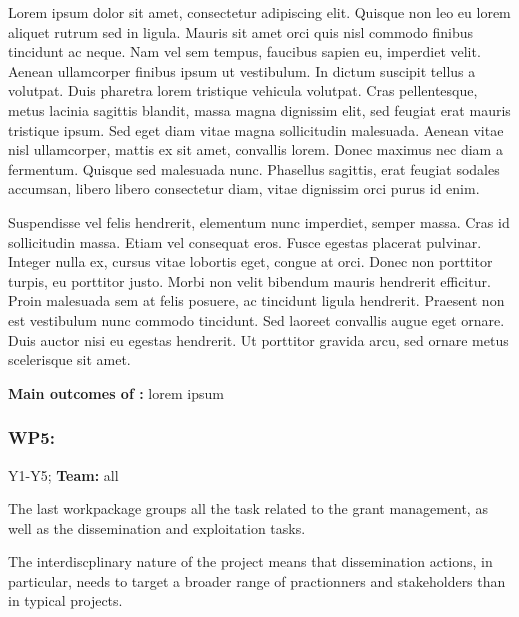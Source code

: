 \begin{rewrite}
Lorem ipsum dolor sit amet, consectetur adipiscing elit. Quisque non leo eu
lorem aliquet rutrum sed in ligula. Mauris sit amet orci quis nisl commodo
finibus tincidunt ac neque. Nam vel sem tempus, faucibus sapien eu,
imperdiet velit. Aenean ullamcorper finibus ipsum ut vestibulum. In dictum
suscipit tellus a volutpat. Duis pharetra lorem tristique vehicula volutpat.
Cras pellentesque, metus lacinia sagittis blandit, massa magna dignissim
elit, sed feugiat erat mauris tristique ipsum. Sed eget diam vitae magna
sollicitudin malesuada. Aenean vitae nisl ullamcorper, mattis ex sit amet,
convallis lorem. Donec maximus nec diam a fermentum. Quisque sed malesuada
nunc. Phasellus sagittis, erat feugiat sodales accumsan, libero libero
consectetur diam, vitae dignissim orci purus id enim.

Suspendisse vel felis hendrerit, elementum nunc imperdiet, semper massa. Cras id
sollicitudin massa. Etiam vel consequat eros. Fusce egestas placerat
pulvinar. Integer nulla ex, cursus vitae lobortis eget, congue at orci.
Donec non porttitor turpis, eu porttitor justo. Morbi non velit bibendum
mauris hendrerit efficitur. Proin malesuada sem at felis posuere, ac
tincidunt ligula hendrerit. Praesent non est vestibulum nunc commodo
tincidunt. Sed laoreet convallis augue eget ornare. Duis auctor nisi eu
egestas hendrerit. Ut porttitor gravida arcu, sed ornare metus scelerisque
sit amet. 
\end{rewrite}


\begin{framed}
    {\noindent\bf Main outcomes of \tDD:} lorem ipsum 
\end{framed}



\subsubsection{WP5: \textbf{\WPZ}}

\begin{framed}
 Y1-Y5; {\bf Team:} all
\end{framed}

The last workpackage groups all the task related to the grant management, as
well as the dissemination and exploitation tasks.

The interdiscplinary nature of the project means that dissemination actions, in
particular, needs to target a broader range of practionners and stakeholders
than in typical projects.

